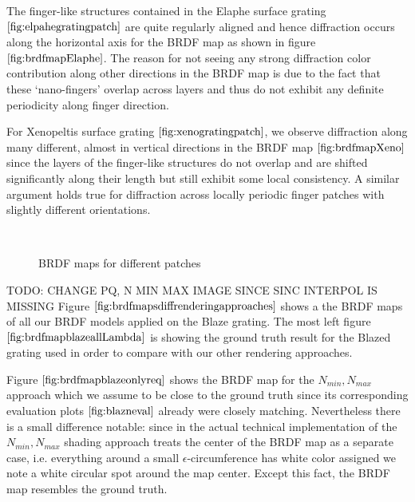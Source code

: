 The finger-like structures contained in the Elaphe surface grating $\ref{fig:elpahegratingpatch}$ are quite regularly aligned and hence diffraction occurs along the horizontal axis for the BRDF map as shown in figure $\ref{fig:brdfmapElaphe}$. The reason for not seeing any strong diffraction color contribution along other directions in the BRDF map is due to the fact that these ‘nano-fingers’ overlap across layers and thus do not exhibit any definite periodicity along finger direction.

For Xenopeltis surface grating $\ref{fig:xenogratingpatch}$, we observe diffraction along many different, almost in vertical directions in the BRDF map $\ref{fig:brdfmapXeno}$ since the layers of the finger-like structures do not overlap and are shifted significantly along their length but still exhibit some local consistency. A similar argument holds true for diffraction across locally periodic finger patches with slightly different orientations. 


\begin{figure}[H]
  \centering
~
~

\caption{BRDF maps for different patches}
\label{fig:brdfmapsdiffpatches}
\end{figure}

TODO:  CHANGE PQ, N MIN MAX IMAGE SINCE SINC INTERPOL IS MISSING
Figure $\ref{fig:brdfmapsdiffrenderingapproaches}$ shows a the BRDF maps of all our BRDF models applied on the Blaze grating. The most left figure $\ref{fig:brdfmapblazeallLambda}$ is showing the ground truth result for the Blazed grating used in order to compare with our other rendering approaches.

Figure $\ref{fig:brdfmapblazeonlyreq}$ shows the BRDF map for the $N_{min}, N_{max}$ approach which we assume to be close to the ground truth since its corresponding evaluation plots $\ref{fig:blazneval}$ already were closely matching. Nevertheless there is a small difference notable: since in the actual technical implementation of the $N_{min}, N_{max}$ shading approach treats the center of the BRDF map as a separate case, i.e. everything around a small $\epsilon$-circumference has white color assigned 
we note a white circular spot around the map center. Except this fact, the BRDF map resembles the ground truth.


